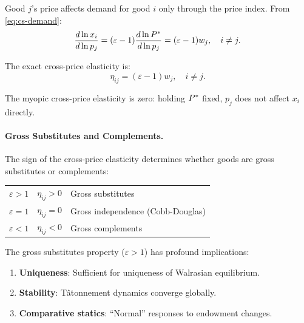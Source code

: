 Good $j$'s price affects demand for good $i$ only through the price index. From \eqref{eq:cs-demand}:
\begin{equation}
\frac{d \ln x_i}{d \ln p_j} = (\varepsilon - 1) \frac{d \ln P^{*}}{d \ln p_j} = (\varepsilon - 1) w_j, \quad i \neq j.
\end{equation}

The exact cross-price elasticity is:
\begin{equation}
\label{eq:exact-cross}
\eta_{ij} = (\varepsilon - 1) w_j, \quad i \neq j.
\end{equation}

The myopic cross-price elasticity is zero: holding $P^{*}$ fixed, $p_j$ does not affect $x_i$ directly.

\paragraph{Gross Substitutes and Complements.}

The sign of the cross-price elasticity determines whether goods are gross substitutes or complements:

\begin{center}
\begin{tabular}{@{}lcl@{}}
\toprule
$\varepsilon > 1$ & $\eta_{ij} > 0$ & Gross substitutes \\
$\varepsilon = 1$ & $\eta_{ij} = 0$ & Gross independence (Cobb-Douglas) \\
$\varepsilon < 1$ & $\eta_{ij} < 0$ & Gross complements \\
\bottomrule
\end{tabular}
\end{center}

\begin{calloutimportant}
The gross substitutes property ($\varepsilon > 1$) has profound implications:
\begin{enumerate}[nosep]
    \item \textbf{Uniqueness}: Sufficient for uniqueness of Walrasian equilibrium.
    \item \textbf{Stability}: T\^atonnement dynamics converge globally.
    \item \textbf{Comparative statics}: ``Normal'' responses to endowment changes.
\end{enumerate}
\end{calloutimportant}

